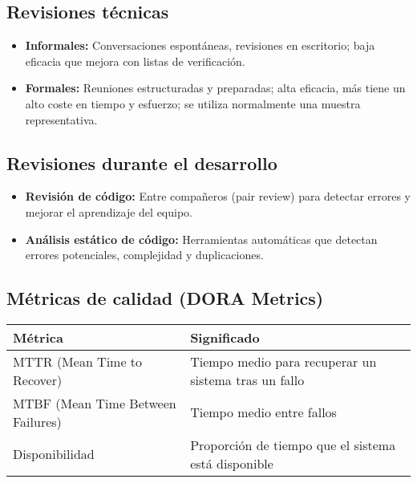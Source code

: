 \subsection{Revisiones técnicas}\label{subsec:revisiones-tecnicas}

\begin{itemize}
    \item \textbf{Informales:} Conversaciones espontáneas, revisiones en escritorio; baja eficacia que mejora con listas de verificación.
    \item \textbf{Formales:} Reuniones estructuradas y preparadas; alta eficacia, más tiene un alto coste en tiempo y esfuerzo; se utiliza normalmente una muestra representativa.
\end{itemize}

\subsection{Revisiones durante el desarrollo}\label{subsec:revisiones-durante-el-desarrollo}

\begin{itemize}
    \item \textbf{Revisión de código:} Entre compañeros (pair review) para detectar errores y mejorar el aprendizaje del equipo.
    \item \textbf{Análisis estático de código:} Herramientas automáticas que detectan errores potenciales, complejidad y duplicaciones.
\end{itemize}

\subsection{Métricas de calidad (DORA Metrics)}\label{subsec:metricas-de-calidad-(dora-metrics)}

\begin{center}
    \begin{tabular}{|l|l|}
        \hline
        \textbf{Métrica}                  & \textbf{Significado}                                 \\
        \hline
        MTTR (Mean Time to Recover)       & Tiempo medio para recuperar un sistema tras un fallo \\
        MTBF (Mean Time Between Failures) & Tiempo medio entre fallos                            \\
        Disponibilidad                    & Proporción de tiempo que el sistema está disponible  \\
        \hline
    \end{tabular}
\end{center}

